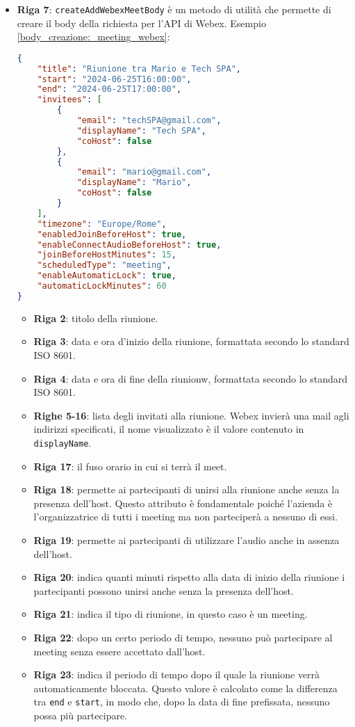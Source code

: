 \begin{itemize}
    \item \textbf{Riga 7}: \texttt{createAddWebexMeetBody} è un metodo di utilità che permette di creare il body
    della richiesta per l'API di Webex. Esempio \ref{body_creazione:_meeting_webex}:
    \clearpage
    \begin{lstlisting}[language=json, caption={body creazione meeting - Webex}, label={body_creazione:_meeting_webex}]
{
    "title": "Riunione tra Mario e Tech SPA",
    "start": "2024-06-25T16:00:00",
    "end": "2024-06-25T17:00:00",
    "invitees": [
        {
            "email": "techSPA@gmail.com",
            "displayName": "Tech SPA",
            "coHost": false
        },
        {
            "email": "mario@gmail.com",
            "displayName": "Mario",
            "coHost": false
        }
    ],
    "timezone": "Europe/Rome",
    "enabledJoinBeforeHost": true,
    "enableConnectAudioBeforeHost": true,
    "joinBeforeHostMinutes": 15,
    "scheduledType": "meeting",
    "enableAutomaticLock": true,
    "automaticLockMinutes": 60
}
    \end{lstlisting}
    \begin{itemize}
        \item \textbf{Riga 2}: titolo della riunione.
        \item \textbf{Riga 3}: data e ora d'inizio della riunione, formattata secondo lo standard ISO 8601.
        \item \textbf{Riga 4}: data e ora di fine della riunionw, formattata secondo lo standard ISO 8601.
        \item \textbf{Righe 5-16}: lista degli invitati alla riunione. Webex invierà una mail agli indirizzi specificati, il nome
        visualizzato è il valore contenuto in \texttt{displayName}.
        \item \textbf{Riga 17}: il fuso orario in cui si terrà il meet.
        \item \textbf{Riga 18}: permette ai partecipanti di unirsi alla riunione anche senza la presenza dell'host. 
        Questo attributo è fondamentale poiché l'azienda è l'organizzatrice di tutti i meeting ma non parteciperà a nessuno di essi.
        \item \textbf{Riga 19}: permette ai partecipanti di utilizzare l'audio anche in assenza dell'host.
        \item \textbf{Riga 20}: indica quanti minuti rispetto alla data di inizio della riunione i partecipanti possono unirsi anche senza la presenza dell'host.
        \item \textbf{Riga 21}: indica il tipo di riunione, in questo caso è un meeting.
        \item \textbf{Riga 22}: dopo un certo periodo di tempo, nessuno può partecipare al meeting senza essere accettato dall'host.
        \item \textbf{Riga 23}: indica il periodo di tempo dopo il quale la riunione verrà automaticamente bloccata. 
        Questo valore è calcolato come la differenza tra \texttt{end} e \texttt{start}, in modo che, dopo la data di fine prefissata, 
        nessuno possa più partecipare.
    \end{itemize}


\end{itemize}
